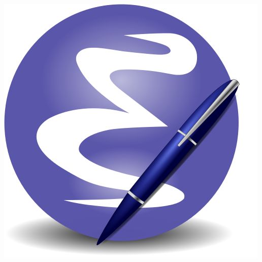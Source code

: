 \documentclass{minimal}
\begin{document}
\begin{multicols}{3}
\vspace*{\fill}
\begin{center}
\includegraphics[scale=1.]{gnu-emacs.png}
\end{center}
\vspace*{\fill}
\columnbreak
\fontsize{6pt}{7pt}\selectfont

\fontsize{8pt}{9pt}\selectfont

\def\key#1#2{#1 & \texttt{#2} \\}



\end{multicols}
\end{document}
